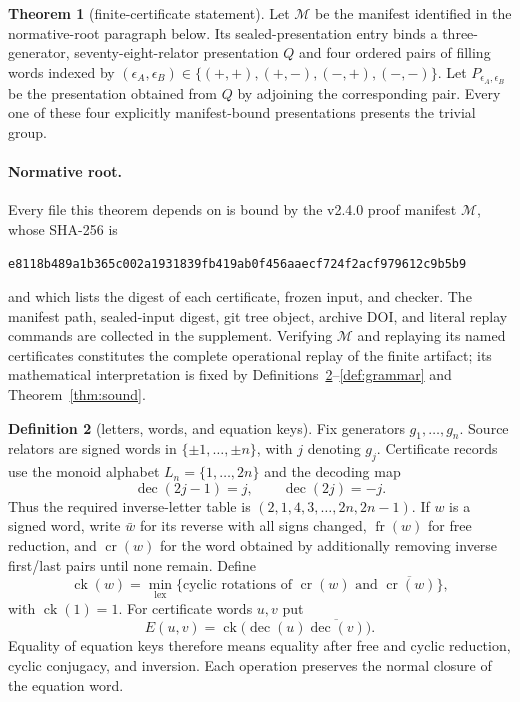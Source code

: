 \documentclass[11pt]{article}
\theoremstyle{definition}
\newtheorem{theorem}{Theorem}[section]
\newtheorem{definition}[theorem]{Definition}
\begin{document}
\begin{theorem}[finite-certificate statement]\label{thm:main}
Let $\mathcal M$ be the manifest identified in the normative-root paragraph
below.  Its sealed-presentation entry binds a three-generator,
seventy-eight-relator presentation $Q$ and four ordered pairs of filling
words indexed by
$(\epsilon_A,\epsilon_B)\in\{(+,+),(+,-),(-,+),(-,-)\}$.
Let $P_{\epsilon_A,\epsilon_B}$ be the presentation obtained from $Q$ by
adjoining the corresponding pair.  Every one of these four explicitly
manifest-bound presentations presents the trivial group.
\end{theorem}

\paragraph{Normative root.}
Every file this theorem depends on is bound by the v2.4.0 proof manifest
$\mathcal M$, whose
SHA-256 is
\begin{center}\small\texttt{e8118b489a1b365c002a1931839fb419ab0f456aaecf724f2acf979612c9b5b9}\end{center}
and which lists the digest of each certificate, frozen input, and checker.
The manifest path, sealed-input digest, git tree object, archive DOI, and
literal replay commands are collected in the supplement.  Verifying
$\mathcal M$ and replaying its named certificates constitutes the complete
operational replay of the finite artifact; its mathematical interpretation is fixed by
Definitions~\ref{def:keys}--\ref{def:grammar} and
Theorem~\ref{thm:sound}.


\begin{definition}[letters, words, and equation keys]\label{def:keys}
Fix generators $g_1,\ldots,g_n$.  Source relators are signed words in
$\{\pm1,\ldots,\pm n\}$, with $j$ denoting $g_j$.  Certificate records use
the monoid alphabet $L_n=\{1,\ldots,2n\}$ and the decoding map
\[
 \operatorname{dec}(2j-1)=j,\qquad \operatorname{dec}(2j)=-j.
\]
Thus the required inverse-letter table is
$(2,1,4,3,\ldots,2n,2n-1)$.  If $w$ is a signed word, write $\bar w$ for
its reverse with all signs changed, $\operatorname{fr}(w)$ for free
reduction, and $\operatorname{cr}(w)$ for the word obtained by additionally
removing inverse first/last pairs until none remain.  Define
\[
 \operatorname{ck}(w)=
 \min_{\mathrm{lex}}\{\text{cyclic rotations of }
   \operatorname{cr}(w)\text{ and }\overline{\operatorname{cr}(w)}\},
\]
with $\operatorname{ck}(1)=1$.  For certificate words $u,v$ put
\[
 E(u,v)=\operatorname{ck}\bigl(\operatorname{dec}(u)
   \overline{\operatorname{dec}(v)}\bigr).
\]
Equality of equation keys therefore means equality after free and cyclic
reduction, cyclic conjugacy, and inversion.  Each operation preserves the
normal closure of the equation word.
\end{definition}
\end{document}
